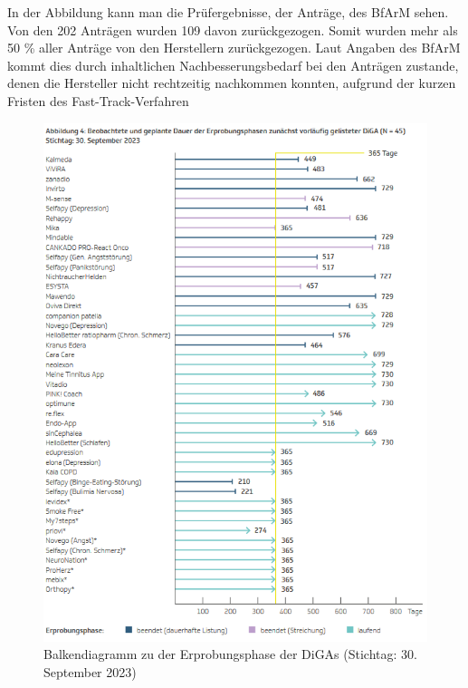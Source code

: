 \documentclass{article}
\begin{document}
			In der Abbildung kann man die Prüfergebnisse, der Anträge, des BfArM sehen. Von den 202 Anträgen wurden 109 davon zurückgezogen. Somit wurden mehr als 50 \% aller Anträge von den Herstellern zurückgezogen. Laut Angaben des BfArM kommt dies durch inhaltlichen Nachbesserungsbedarf bei den Anträgen zustande, denen die Hersteller nicht rechtzeitig nachkommen konnten, aufgrund der kurzen Fristen des Fast-Track-Verfahren\cite[vgl. Z. 37]{tipps-diga-antragsansteller}   
			\newpage
			\begin{figure}[htbp]
				\includegraphics[height=0.5\textheight]{./grafiken/erprobungs_phase_diga}
				\centering
				\caption[Erprobungsphase von den DiGAs]{Balkendiagramm zu der Erprobungsphase der DiGAs (Stichtag: 30. September 2023)}
				\label{Abb-erprobungsphase-diga}
			\end{figure}
\end{document}
